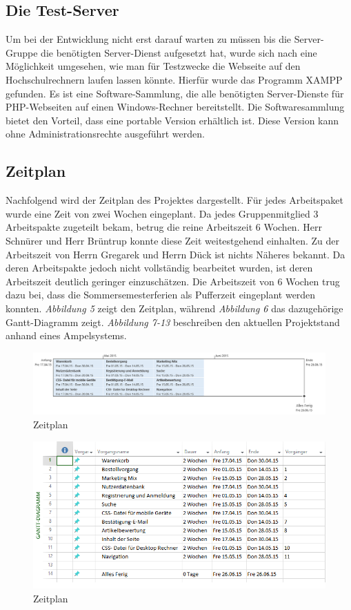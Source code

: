 \subsection{Die Test-Server}
Um bei der Entwicklung nicht erst darauf warten zu müssen bis die Server-Gruppe die benötigten Server-Dienst aufgesetzt hat, wurde sich nach eine Möglichkeit umgesehen, wie man für Testzwecke die Webseite auf den Hochschulrechnern laufen lassen könnte. Hierfür wurde das Programm XAMPP gefunden. Es ist eine Software-Sammlung, die alle benötigten Server-Dienste für PHP-Webseiten auf einen Windows-Rechner bereitstellt. Die Softwaresammlung bietet den Vorteil, dass eine portable Version erhältlich ist. Diese Version kann ohne Administrationsrechte ausgeführt werden.

\subsection{Zeitplan}
Nachfolgend wird der Zeitplan des Projektes dargestellt. Für jedes Arbeitspaket wurde eine Zeit von zwei Wochen eingeplant. Da jedes Gruppenmitglied 3 Arbeitspakte zugeteilt bekam, betrug die reine Arbeitszeit 6 Wochen. Herr Schnürer und Herr Brüntrup konnte diese Zeit weitestgehend einhalten. Zu der Arbeitszeit von Herrn Gregarek und Herrn Dück  ist nichts Näheres bekannt. Da deren Arbeitspakte jedoch nicht vollständig bearbeitet wurden, ist deren Arbeitszeit deutlich geringer einzuschätzen. Die Arbeitszeit von 6 Wochen trug dazu bei, dass die Sommersemesterferien als Pufferzeit eingeplant werden konnten. \textit{Abbildung 5} zeigt den Zeitplan, während \textit{Abbildung 6} das dazugehörige Gantt-Diagramm zeigt. \textit{Abbildung 7-13} beschreiben den aktuellen Projektstand anhand eines Ampelsystems.

\begin{figure}[H] 
  \centering
     \includegraphics[width=18cm]{Bilder/Abbildung16_Zeitplan.png}
  \caption{Zeitplan}
\end{figure}

\begin{figure}[H] 
  \centering
     \includegraphics[width=15cm]{Bilder/Abbildung17_GanttDiagramm.png}
  \caption{Zeitplan}
\end{figure}

